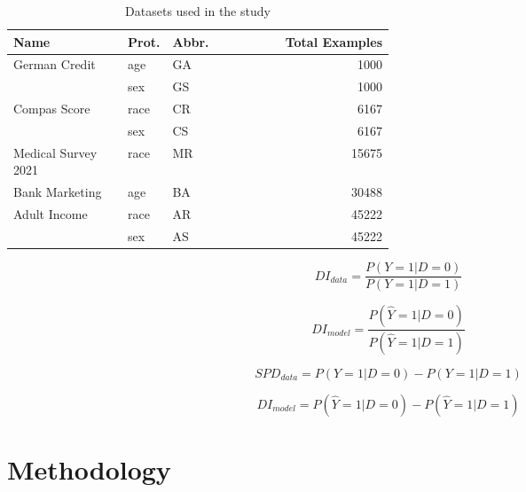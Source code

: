 \documentclass{article}
\begin{document}
\begin{table}
  \centering
  \caption{Datasets used in the study}
  \begin{tabular}{p{0.3\linewidth} p{0.1\linewidth} p{0.1\linewidth} r}
    \toprule
    \textbf{Name} & \textbf{Prot.} & \textbf{Abbr.} &
    \textbf{Total Examples}\\
    \midrule
    \multirow{2}{*}{German Credit \cite{CITEME}} & age & GA &
    1000\\
      & sex & GS & 1000\\
    \multirow{2}{*}{Compas Score \cite{CITEME}} & race & CR &
    6167\\
      & sex & CS & 6167\\
    Medical Survey 2021 \cite{CITEME} & race & MR & 15675\\
    Bank Marketing \cite{CITEME} & age & BA & 30488\\
    \multirow{2}{*}{Adult Income \cite{CITEME}} & race & AR & 45222\\
      & sex & AS & 45222\\
    \bottomrule
  \end{tabular}
  \label{tab:datasets}
\end{table}



\begin{equation}
  DI_{data} = \frac{P(Y=1|D=0)}{P(Y=1|D=1)}
  \label{eq:di-data}
\end{equation}

\begin{equation}
  DI_{model} = \frac{P(\hat{Y}=1|D=0)}{P(\hat{Y}=1|D=1)}
  \label{eq:di-model}
\end{equation}

\begin{equation}
  SPD_{data} = P(Y=1|D=0)-P(Y=1|D=1)
  \label{eq:spd-data}
\end{equation}

\begin{equation}
  DI_{model} = P(\hat{Y}=1|D=0)-P(\hat{Y}=1|D=1)
  \label{eq:spd-model}
\end{equation}


\section{Methodology}\label{sec:method}
\end{document}
